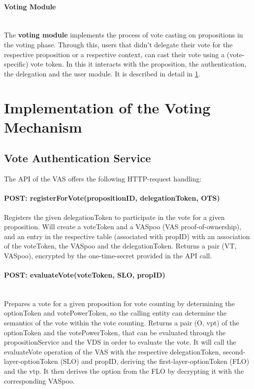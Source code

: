 \paragraph{Voting Module} \mbox{} \\
The \textbf{voting module} implements the process of vote casting on propositions in the voting phase. Through this, users that didn't delegate their vote for the respective proposition or a respective context, can cast their vote using a (vote-specific) vote token.
In this it interacts with the proposition, the authentication, the delegation and the user module. It is described in detail in \ref{sec:Implementation_Voting}.

\section{Implementation of the Voting Mechanism}
\label{sec:Implementation_Voting}


\subsection{Vote Authentication Service}
The API of the VAS offers the following HTTP-request handling:

\paragraph*{POST: registerForVote(propositionID, delegationToken, OTS)}
Registers the given delegationToken to participate in the vote for a given proposition.
Will create a voteToken and a VASpoo (VAS proof-of-ownership), and an entry in the respective table (associated with propID) with an association of the voteToken, the VASpoo and the delegationToken.
Returns a pair (VT, VASpoo), encrypted by the one-time-secret provided in the API call.

\paragraph*{POST: evaluateVote(voteToken, SLO, propID)} \mbox{} \\
Prepares a vote for a given proposition for vote counting by determining the optionToken and votePowerToken, so the calling entity can determine the semantics of the vote within the vote counting.
Returns a pair (O, vpt) of the optionToken and the votePowerToken, that can be evaluated through the propositionService and the VDS in order to evaluate the vote.
It will call the evaluateVote operation of the VAS with the respective delegationToken, second-layer-optionToken (SLO) and propID, deriving the first-layer-optionToken (FLO) and the vtp. It then derives the option from the FLO by decrypting it with the corresponding VASpoo.

